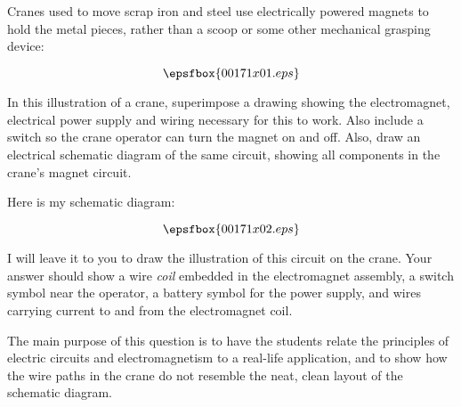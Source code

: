

Cranes used to move scrap iron and steel use electrically powered magnets to hold the metal pieces, rather than a scoop or some other mechanical grasping device:

$$\epsfbox{00171x01.eps}$$

In this illustration of a crane, superimpose a drawing showing the electromagnet, electrical power supply and wiring necessary for this to work.  Also include a switch so the crane operator can turn the magnet on and off.  Also, draw an electrical schematic diagram of the same circuit, showing all components in the crane's magnet circuit.







Here is my schematic diagram:

$$\epsfbox{00171x02.eps}$$

I will leave it to you to draw the illustration of this circuit on the crane.  Your answer should show a wire {\it coil} embedded in the electromagnet assembly, a switch symbol near the operator, a battery symbol for the power supply, and wires carrying current to and from the electromagnet coil.







The main purpose of this question is to have the students relate the principles of electric circuits and electromagnetism to a real-life application, and to show how the wire paths in the crane do not resemble the neat, clean layout of the schematic diagram.




